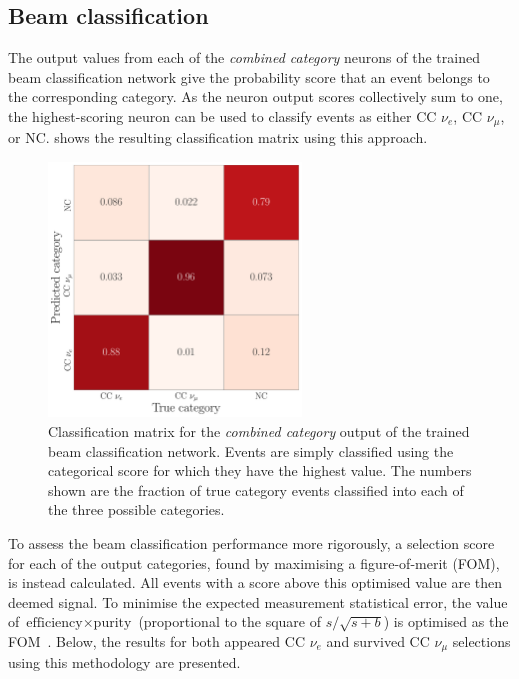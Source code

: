 \subsection{Beam classification} %
\label{sec:results_eval_beam} %

The output values from each of the \emph{combined category} neurons of the trained beam
classification network give the probability score that an event belongs to the corresponding
category. As the neuron output scores collectively sum to one, the highest-scoring neuron can be
used to classify events as either CC $\nu_{e}$, CC $\nu_{\mu}$, or NC.
 shows the resulting classification matrix using this
approach.

\begin{figure} %
    \includegraphics[width=0.6\textwidth]{diagrams/7-results/final_comb_cat_confusion.pdf}
    \caption[Classification matrix for the combined category output of the beam classification
        network] {Classification matrix for the \emph{combined category} output of the trained
        beam classification network. Events are simply classified using the categorical score for
        which they have the highest value. The numbers shown are the fraction of true category
        events classified into each of the three possible categories.}
    \label{fig:final_comb_cat_confusion}
\end{figure}

To assess the beam classification performance more rigorously, a selection score for each of the
output categories, found by maximising a figure-of-merit (FOM), is instead calculated. All events
with a score above this optimised value are then deemed signal. To minimise the expected
measurement statistical error, the value of $\text{efficiency}\times\text{purity}$ (proportional
to the square of $s/\sqrt{s+b}$) is optimised as the FOM~\cite{list2002}. Below, the results for
both appeared CC $\nu_{e}$ and survived CC $\nu_{\mu}$ selections using this methodology are
presented.


